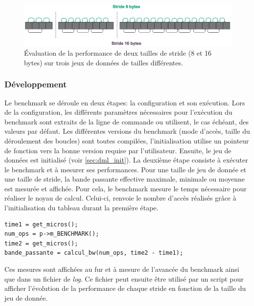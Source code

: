         \begin{figure}[h!]
        \center
        \includegraphics[width=14cm]{images/dml_stride_intro.png}
        \caption{\label{pic:dml_stride_intro}Évaluation de la performance de deux tailles de stride (8 et 16 bytes) sur trois jeux de données de tailles différentes.}
        \end{figure}

    
    \subsubsection{Développement}

        Le benchmark se déroule en deux étapes: la configuration et son exécution.
        Lors de la configuration, les différents paramètres nécessaires pour l'exécution du benchmark sont extraits de la ligne de commande ou utilisent, le cas échéant, des valeurs par défaut. Les différentes versions du benchmark (mode d'accès, taille du déroulement des boucles) sont toutes compilées, l'initialisation utilise un pointeur de fonction vers la bonne version requise par l'utilisateur. Ensuite, le jeu de données est initialisé (voir \autoref{sec:dml_init}). 
        La deuxième étape consiste à exécuter le benchmark et à mesurer ses performances. Pour une taille de jeu de donnée et une taille de stride, la bande passante effective maximale, minimale ou moyenne est mesurée et affichée. Pour cela, le benchmark mesure le temps nécessaire pour réaliser le noyau de calcul. Celui-ci, renvoie le nombre d'accès réalisés grâce à l'initialisation du tableau durant la première étape. 
            \begin{verbatim}
time1 = get_micros();
num_ops = p->m_BENCHMARK();
time2 = get_micros();
bande_passante = calcul_bw(num_ops, time2 - time1);
            \end{verbatim}
            
        Ces mesures sont affichées au fur et à mesure de l'avancée du benchmark ainsi que dans un fichier de \textit{log}. Ce fichier peut ensuite être utilisé par un script pour afficher l'évolution de la performance de chaque stride en fonction de la taille du jeu de donnée. 
            
